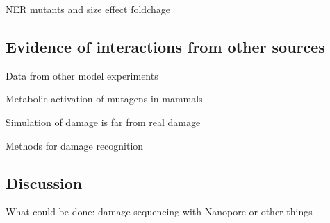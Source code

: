 NER mutants and size effect foldchage


\subsection{Evidence of interactions from other sources}

Data from other model experiments

Metabolic activation of mutagens in mammals

Simulation of damage is far from real damage

Methods for damage recognition



\subsection{Discussion}

What could be done: damage sequencing with Nanopore or other things



